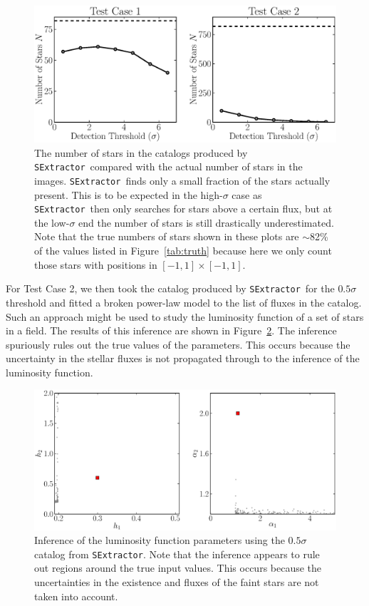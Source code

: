 \documentclass[manuscript]{aastex}
\newcommand{\sex}{{\tt SExtractor}}
\begin{document}
\begin{figure}
\begin{center}
\includegraphics[width=\textwidth]{Figures/sex_N.eps}
\end{center}
\caption{The number of stars in the catalogs produced by \sex~compared with the
actual number of stars in the images. \sex~finds only a small fraction of the
stars actually present. This is to be expected in the high-$\sigma$ case as
\sex~then only searches for stars above a certain flux, but at the low-$\sigma$
end the number of stars is still drastically underestimated. Note that the true
numbers
of stars shown in these plots are $\sim$82\% of the values listed in
Figure~\ref{tab:truth} because here we only count those stars with positions
in $[-1, 1] \times [-1, 1]$.
\label{fig:sex_N}}
\end{figure}

For Test Case 2, we then took the catalog produced by \sex~for the $0.5\sigma$
threshold and fitted a broken power-law model to the list of fluxes in the catalog.
Such an approach might be used to study the luminosity function of a set of stars
in a field. The results of this inference are shown in Figure~\ref{fig:sex_inference}.
The inference spuriously rules out the true values of the parameters. This
occurs because the uncertainty in the stellar fluxes is not propagated through
to the inference of the luminosity function.

\begin{figure}
\begin{center}
\includegraphics[width=\textwidth]{Figures/sex_inference.eps}
\end{center}
\caption{Inference of the luminosity function parameters using the $0.5\sigma$
catalog from \sex. Note that the inference appears to rule out regions around
the true input values. This occurs because the uncertainties in the existence
and fluxes of the faint stars are not taken into account.
\label{fig:sex_inference}}
\end{figure}
\end{document}
